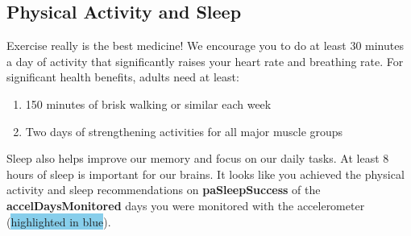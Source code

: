 
\subsection{Physical Activity and Sleep}

Exercise really is the best medicine! We encourage you to do at least 30 minutes a day of activity that significantly raises your heart rate and breathing rate. For significant health benefits, adults need at least:

  \begin{enumerate}
    \item 150 minutes of brisk walking or similar each week
    \item Two days of strengthening activities for all major muscle groups
  \end{enumerate}    

Sleep also helps improve our memory and focus on our daily tasks. At least 8 hours of sleep is important for our brains. It looks like you achieved the physical activity and sleep recommendations on \textbf{{paSleepSuccess}} of the \textbf{{accelDaysMonitored}} days you were monitored with the accelerometer (\colorbox{skyblue}{highlighted in blue}).



